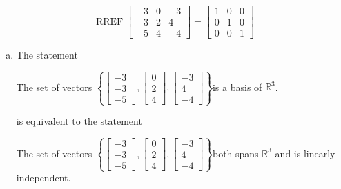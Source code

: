 \begin{exerciseAnswer} 


\[\operatorname{RREF} \left[\begin{array}{ccc}
-3 & 0 & -3 \\
-3 & 2 & 4 \\
-5 & 4 & -4
\end{array}\right] = \left[\begin{array}{ccc}
1 & 0 & 0 \\
0 & 1 & 0 \\
0 & 0 & 1
\end{array}\right] \]


\begin{enumerate}[(a)]
\item The statement 
\begin{center}\begin{minipage}{0.8\textwidth}
 The set of vectors \( \left\{ \left[\begin{array}{c}
-3 \\
-3 \\
-5
\end{array}\right] , \left[\begin{array}{c}
0 \\
2 \\
4
\end{array}\right] , \left[\begin{array}{c}
-3 \\
4 \\
-4
\end{array}\right] \right\} \)is a basis of \(\mathbb{R}^3\). 
\end{minipage}\end{center}
     is equivalent to the statement 
\begin{center}\begin{minipage}{0.8\textwidth}
 The set of vectors \( \left\{ \left[\begin{array}{c}
-3 \\
-3 \\
-5
\end{array}\right] , \left[\begin{array}{c}
0 \\
2 \\
4
\end{array}\right] , \left[\begin{array}{c}
-3 \\
4 \\
-4
\end{array}\right] \right\} \)both spans \(\mathbb{R}^3\) and is linearly independent.
\end{minipage}\end{center}
    

\end{enumerate}
\end{exerciseAnswer}
